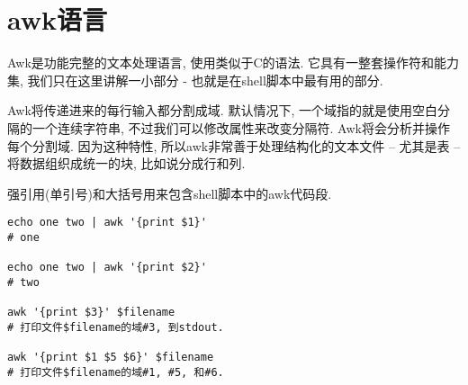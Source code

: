 \section{awk语言}
Awk是功能完整的文本处理语言, 使用类似于C的语法. 它具有一整套操作符和能力集, 我们只在这里讲解一小部分 - 也就是在shell脚本中最有用的部分.

Awk将传递进来的每行输入都分割成域. 默认情况下, 一个域指的就是使用空白分隔的一个连续字符串, 不过我们可以修改属性来改变分隔符. Awk将会分析并操作每个分割域. 因为这种特性, 所以awk非常善于处理结构化的文本文件 -- 尤其是表 -- 将数据组织成统一的块, 比如说分成行和列.

强引用(单引号)和大括号用来包含shell脚本中的awk代码段.

\begin{verbatim}
echo one two | awk '{print $1}'
# one

echo one two | awk '{print $2}'
# two

awk '{print $3}' $filename
# 打印文件$filename的域#3, 到stdout. 
 
awk '{print $1 $5 $6}' $filename
# 打印文件$filename的域#1, #5, 和#6. 
\end{verbatim}

